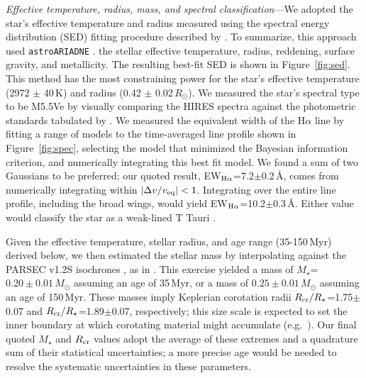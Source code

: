 \documentclass[11pt,twocolumn,tighten,linenumbers]{aastex7}
\begin{document}
{\it Effective temperature, radius, mass, and spectral
classification}---We adopted the star's effective temperature and
radius measured using the spectral energy distribution (SED) fitting
procedure described by \citet{Bouma2024}.  To summarize, this approach
used \texttt{astroARIADNE} \citep{Vines2022} .
 the stellar effective temperature,
radius, reddening, surface gravity, and metallicity.  The resulting
best-fit SED is shown in Figure~\ref{fig:sed}.  This method has the
most constraining power for the star's effective temperature (2972
$\pm$ 40\,K) and radius (0.42 $\pm$ 0.02\,$R_\odot$).  We measured the
star's spectral type to be M5.5Ve by visually comparing the HIRES
spectra against the photometric standards tabulated by
\citet{Bochanski2007}.   We measured the equivalent width of the
H$\alpha$ line by fitting a range of models to the time-averaged line
profile shown in Figure~\ref{fig:spec}, selecting the model that
minimized the Bayesian information criterion, and numerically
integrating this best fit model.  We found a sum of two Gaussians to
be preferred; our quoted result, EW$_{{\rm
H}\alpha}$=7.2$\pm$0.2\,\AA, comes from numerically integrating within
$|\Delta v/v_{\rm eq}|<1$.  Integrating over the entire line profile,
including the broad wings, would yield EW$_{{\rm
H}\alpha}$=10.2$\pm$0.3\,\AA. Either value would classify the star as
a weak-lined T Tauri \citep{Briceno2019}.

Given the effective temperature, stellar radius, and age range
(35-150\,Myr) derived below, we then estimated the stellar mass by
interpolating against the PARSEC v1.2S isochrones \citep{Chen2014}, as
in \citet{Bouma2024}.  This exercise yielded a mass of
$M_\star$=$0.20\pm0.01$\,$M_\odot$ assuming an age of 35\,Myr, or a
mass of $0.25\pm0.01$\,$M_\odot$ assuming an age of 150\,Myr.  These
masses imply Keplerian corotation radii $R_{\rm
cr}/R_\star$=1.75$\pm$0.07 and $R_{\rm cr}/R_\star$=1.89$\pm$0.07,
respectively; this size scale is expected to set the inner boundary at
which corotating material might accumulate
(e.g.~\citealt{Townsend2005,Daley-Yates2024}).  Our final quoted
$M_\star$ and $R_{\rm cr}$ values adopt the average of these extremes
and a quadrature sum of their statistical uncertainties; a more
precise age would be needed to resolve the systematic uncertainties in
these parameters.
\end{document}
